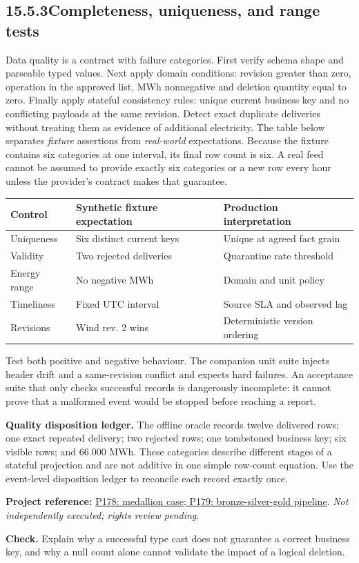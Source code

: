 \documentclass[11pt,twoside]{article}
\newcommand{\topic}[2]{\subsection*{#1\quad #2}}
\newcommand{\repo}[2]{\par\begingroup\fontsize{8.0}{9.6}\selectfont\sffamily\color{inkgray}\textbf{Project reference:} \href{#2}{#1}. \textit{Not independently executed; rights review pending.}\par\endgroup}
\begin{document}
\topic{15.5.3}{Completeness, uniqueness, and range tests}
Data quality is a contract with failure categories. First verify schema shape and parseable typed values. Next apply domain conditions: revision greater than zero, operation in the approved list, MWh nonnegative and deletion quantity equal to zero. Finally apply stateful consistency rules: unique current business key and no conflicting payloads at the same revision. Detect exact duplicate deliveries without treating them as evidence of additional electricity.
The table below separates \emph{fixture} assertions from \emph{real-world} expectations. Because the fixture contains six categories at one interval, its final row count is six. A real feed cannot be assumed to provide exactly six categories or a new row every hour unless the provider's contract makes that guarantee.
\begin{center}\small\begin{tabularx}{\linewidth}{@{}p{27mm}X X@{}}\toprule
Control & Synthetic fixture expectation & Production interpretation\\\midrule
Uniqueness & Six distinct current keys & Unique at agreed fact grain\\
Validity & Two rejected deliveries & Quarantine rate threshold\\
Energy range & No negative MWh & Domain and unit policy\\
Timeliness & Fixed UTC interval & Source SLA and observed lag\\
Revisions & Wind rev. 2 wins & Deterministic version ordering\\\bottomrule\end{tabularx}\end{center}
Test both positive and negative behaviour. The companion unit suite injects header drift and a same-revision conflict and expects hard failures. An acceptance suite that only checks successful records is dangerously incomplete: it cannot prove that a malformed event would be stopped before reaching a report.
\begin{whitebox}\textbf{Quality disposition ledger.} The offline oracle records twelve delivered rows; one exact repeated delivery; two rejected rows; one tombstoned business key; six visible rows; and 66.000 MWh. These categories describe different stages of a stateful projection and are not additive in one simple row-count equation. Use the event-level disposition ledger to reconcile each record exactly once.\end{whitebox}
\repo{P178: medallion case; P179: bronze-silver-gold pipeline}{https://github.com/dabbiruavinash/Snowflake-E-Commerce-Medallion-Architecture-Project}
\textbf{Check.} Explain why a successful type cast does not guarantee a correct business key, and why a null count alone cannot validate the impact of a logical deletion.
\end{document}

